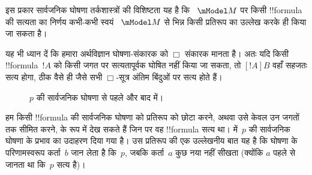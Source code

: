 \documentclass[../../../include/open-logic-section]{subfiles}
\begin{document}
इस प्रकार सार्वजनिक घोषणा तर्कशास्त्रों की विशिष्टता यह है कि
~$\mModel M$ पर किसी !!{formula} की सत्यता का निर्णय कभी-कभी स्वयं
~$\mModel M$ से भिन्न किसी प्रतिरूप का उल्लेख करके ही किया जा सकता है।

यह भी ध्यान दें कि हमारा अर्थविज्ञान घोषणा-संकारक को $\Box$ संकारक मानता
है। अतः यदि किसी !!{formula}~$!A$ को किसी जगत पर सत्यतापूर्वक घोषित नहीं किया
जा सकता, तो $[!A]B$ वहाँ सहजतः सत्य होगा, ठीक वैसे ही जैसे सभी $\Box$-सूत्र
अंतिम बिंदुओं पर सत्य होते हैं।

\begin{figure}
  \begin{center}
  \end{center}
  \caption{$p$ की सार्वजनिक घोषणा से पहले और बाद में।}
\end{figure}

हम किसी !!{formula} की सार्वजनिक घोषणा को प्रतिरूप को छोटा करने, अथवा उसे
केवल उन जगतों तक सीमित करने, के रूप में देख सकते हैं जिन पर वह !!{formula}
सत्य था।  में~$p$ की सार्वजनिक घोषणा के
प्रभाव का उदाहरण दिया गया है। उस प्रतिरूप की एक उल्लेखनीय बात यह है कि
घोषणा के परिणामस्वरूप कर्ता~$b$ जान लेता है कि~$p$, जबकि कर्ता~$a$ कुछ नया
नहीं सीखता (क्योंकि $a$ पहले से जानता था कि~$p$ सत्य है)।
\end{document}
